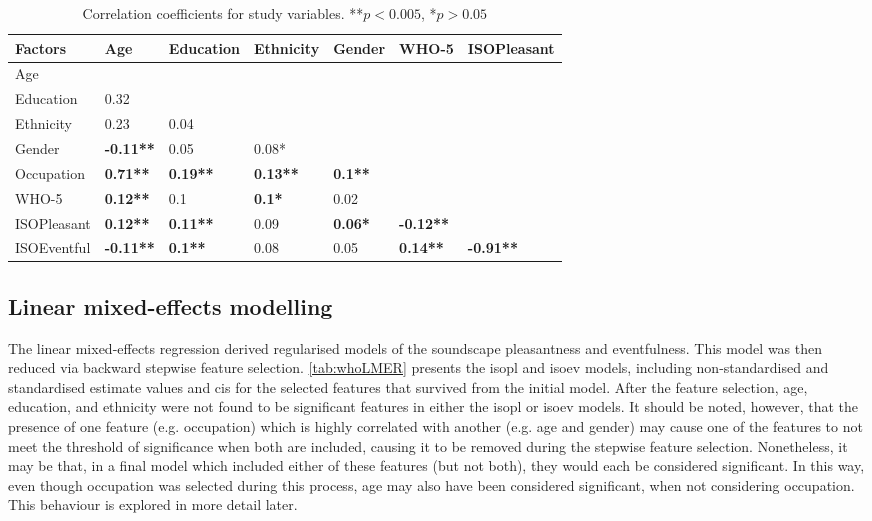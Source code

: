 \begin{table}[!h]
  \centering
  \caption{Correlation coefficients for study variables. **$p<0.005$, *$p>0.05$\label{tab:whoCorr}}
  \begin{tabular}{@{}l|llllll@{}}
  \toprule
  Factors     & Age              & Education       & Ethnicity       & Gender         & WHO-5            & ISOPleasant      \\ \midrule
  Age       &                  &      &               &      &  &  \\
  Education & 0.32             &      &               &      &  &  \\
  Ethnicity & 0.23             & 0.04 &               &      &  &  \\
  Gender    & \textbf{-0.11**} & 0.05 & 0.08*         &      &  &  \\
  Occupation  & \textbf{0.71**}  & \textbf{0.19**} & \textbf{0.13**} & \textbf{0.1**} &                  &                  \\
  WHO-5     & \textbf{0.12**}  & 0.1  & \textbf{0.1*} & 0.02 &  &  \\
  ISOPleasant & \textbf{0.12**}  & \textbf{0.11**} & 0.09            & \textbf{0.06*} & \textbf{-0.12**} &                  \\
  ISOEventful & \textbf{-0.11**} & \textbf{0.1**}  & 0.08            & 0.05           & \textbf{0.14**}  & \textbf{-0.91**} \\ \bottomrule
  \end{tabular}
  \end{table}

  \subsection{Linear mixed-effects modelling}
\label{sec:whoLMERinit}
  The linear mixed-effects regression derived regularised models of the soundscape pleasantness and eventfulness. This model was then reduced via backward stepwise feature selection. \cref{tab:whoLMER} presents the \gls{isopl} and \gls{isoev} models, including non-standardised and standardised estimate values and \glspl{ci} for the selected features that survived from the initial model. After the feature selection, age, education, and ethnicity were not found to be significant features in either the \gls{isopl} or \gls{isoev} models. It should be noted, however, that the presence of one feature (e.g. occupation) which is highly correlated with another (e.g. age and gender) may cause one of the features to not meet the threshold of significance when both are included, causing it to be removed during the stepwise feature selection. Nonetheless, it may be that, in a final model which included either of these features (but not both), they would each be considered significant. In this way, even though occupation was selected during this process, age may also have been considered significant, when not considering occupation. This behaviour is explored in more detail later.

